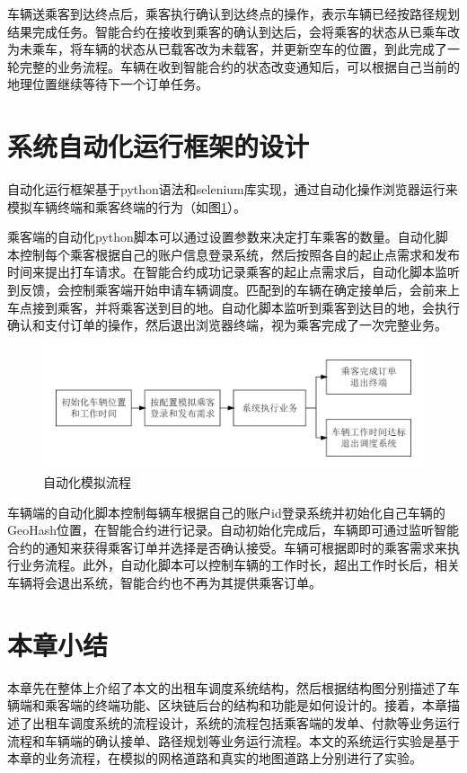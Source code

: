 车辆送乘客到达终点后，乘客执行确认到达终点的操作，表示车辆已经按路径规划结果完成任务。智能合约在接收到乘客的确认到达后，会将乘客的状态从已乘车改为未乘车，将车辆的状态从已载客改为未载客，并更新空车的位置，到此完成了一轮完整的业务流程。车辆在收到智能合约的状态改变通知后，可以根据自己当前的地理位置继续等待下一个订单任务。


\section{系统自动化运行框架的设计}
自动化运行框架基于python语法和selenium库实现，通过自动化操作浏览器运行来模拟车辆终端和乘客终端的行为（如图\ref{fig:auto}）。

乘客端的自动化python脚本可以通过设置参数来决定打车乘客的数量。自动化脚本控制每个乘客根据自己的账户信息登录系统，然后按照各自的起止点需求和发布时间来提出打车请求。在智能合约成功记录乘客的起止点需求后，自动化脚本监听到反馈，会控制乘客端开始申请车辆调度。匹配到的车辆在确定接单后，会前来上车点接到乘客，并将乘客送到目的地。自动化脚本监听到乘客到达目的地，会执行确认和支付订单的操作，然后退出浏览器终端，视为乘客完成了一次完整业务。

\begin{figure}[h]
  \centering
  \includegraphics[width=1.0\textwidth]{figures/自动化流程}
  \caption{自动化模拟流程}\label{fig:auto}
\end{figure}

车辆端的自动化脚本控制每辆车根据自己的账户id登录系统并初始化自己车辆的GeoHash位置，在智能合约进行记录。自动初始化完成后，车辆即可通过监听智能合约的通知来获得乘客订单并选择是否确认接受。车辆可根据即时的乘客需求来执行业务流程。此外，自动化脚本可以控制车辆的工作时长，超出工作时长后，相关车辆将会退出系统，智能合约也不再为其提供乘客订单。

\section{本章小结}
本章先在整体上介绍了本文的出租车调度系统结构，然后根据结构图分别描述了车辆端和乘客端的终端功能、区块链后台的结构和功能是如何设计的。接着，本章描述了出租车调度系统的流程设计，系统的流程包括乘客端的发单、付款等业务运行流程和车辆端的确认接单、路径规划等业务运行流程。本文的系统运行实验是基于本章的业务流程，在模拟的网格道路和真实的地图道路上分别进行了实验。